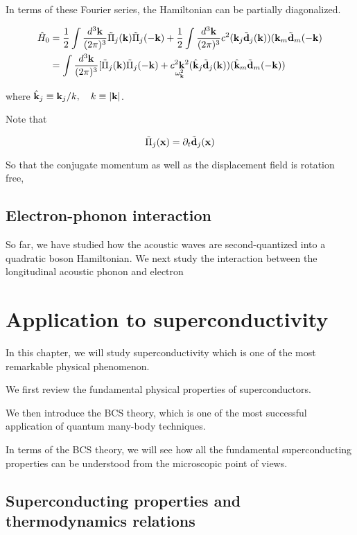﻿\documentclass[twoside]{book}
\numberwithin{equation}{section}
\begin{document}
In terms of these Fourier series, the Hamiltonian can be partially diagonalized. 

\[\begin{split}
\hat{H}_0 &= \frac{1}{2}\int\frac{d^3{\bf k}}{(2\pi)^3}\tilde{\Pi}_j({\bf k})\tilde{\Pi}_j({-\bf k}) + \frac{1}{2}\int\frac{d^3{\bf k}}{(2\pi)^3} c^2({\bf k}_j\tilde{\bf d}_j({\bf k}))({\bf k}_m\tilde{\bf d}_m(-{\bf k})\\
&=\int\frac{d^3{\bf k}}{(2\pi)^3}[\tilde{\Pi}_j({\bf k})\tilde{\Pi}_j({-\bf k})+\underset{\omega_{\bf k}^2}{c^2{\bf k}^2}(\hat{\bf k}_j\tilde{\bf d}_j({\bf k}))(\hat{\bf k}_m\tilde{\bf d}_m(-{\bf k}))
\end{split}\]

where $\hat{\bf k}_j \equiv {\bf k}_j/k,\quad k\equiv|\bf k|$. 

Note that

\[\tilde{\Pi}_j({\bf x}) = \partial_t\tilde{\bf d}_j(\bf x) \]

So that the conjugate momentum as well as the displacement field is rotation free, 


\section{Electron-phonon interaction} \label{se5-2}

So far, we have studied how the acoustic waves are second-quantized into a quadratic boson Hamiltonian. We next study the interaction between the longitudinal acoustic phonon and electron




\chapter{Application to superconductivity}


In this chapter, we will study superconductivity which is one of the most remarkable physical phenomenon.

We first review the fundamental physical properties of superconductors.

We then introduce the BCS theory, which is one of the most successful application of quantum many-body techniques.

In terms of the BCS theory, we will see how all the fundamental superconducting properties can be understood from the microscopic point of views.



\section{Superconducting properties and thermodynamics relations}
\end{document}
